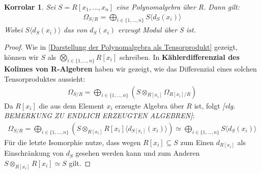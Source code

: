 \documentclass[10pt,a4paper]{report}
\newcommand{\comment}[1]{}
\newcounter{Aussage}[chapter]
\newtheorem{korrolar}[Aussage]{Korrolar}
\newcommand{\divR}[2]{\Omega_{#1/#2}}
\newcommand{\divf}[1]{d_{#1}}
\newcommand{\Tensor}[3]{#1 \otimes_{#2} #3}
\begin{document}
\begin{korrolar}\label{Differenzial von Polynomalgebren 1}
Sei $S = R[x_1,...,x_n]$ eine Polynomalgebra über R. Dann gilt:
\begin{gather*}
\divR{S}{R} = \bigoplus_{i \in \lbrace 1,...,n \rbrace} S \langle \divf{S}(x_i) \rangle 
\end{gather*}
Wobei $S\langle \divf{S}(x_i)\rangle$ das von $\divf{S}(x_i)$ erzeugt Modul über S ist.
\end{korrolar}
\begin{proof}
Wie in \cref{Darstellung der Polynomalgebra als Tensorprodukt} gezeigt, können wir $S$ als $\bigotimes_{i \in \lbrace 1,...,n \rbrace} R[x_i]$ schreiben. In \textbf{Kählerdifferenzial des Kolimes von R-Algebren} \comment{\cref{Kählerdifferenzial des Kolimes von R-Algebren}} haben wir gezeigt, wie das Differenzial eines solchen Tensorproduktes aussieht:
\begin{gather*}
\divR{S}{R} = \bigoplus_{i \in \lbrace 1,...,n \rbrace} (\Tensor{S}{R[x_i]}{\divR{R[x_i]}{R}})
\end{gather*}
Da $R[x_i]$ die aus dem Element $x_i$ erzeugte Algebra über $R$ ist, folgt \textit{[vlg. BEMERKUNG ZU ENDLICH ERZEUGTEN ALGEBREN]}: 
\begin{gather*}
\divR{S}{R} = \bigoplus_{i \in \lbrace 1,...,n \rbrace} (\Tensor{S}{R[x_i]}{R[x_i]\langle \divf{S[x_i]}(x_i) \rangle})
\simeq \bigoplus_{i \in \lbrace 1,...,n \rbrace} S \langle \divf{S}(x_i) \rangle 
\end{gather*}
Für die letzte Isomorphie nutze, dass wegen $R[x_i] \subseteq S$ zum Einen $\divf{R[x_i]}$ als Einschränkung von $\divf{S}$ gesehen werden kann und zum Anderen $\Tensor{S}{R[x_i]}{R[x_i]} \simeq S$ gilt.
\end{proof}
\end{document}

